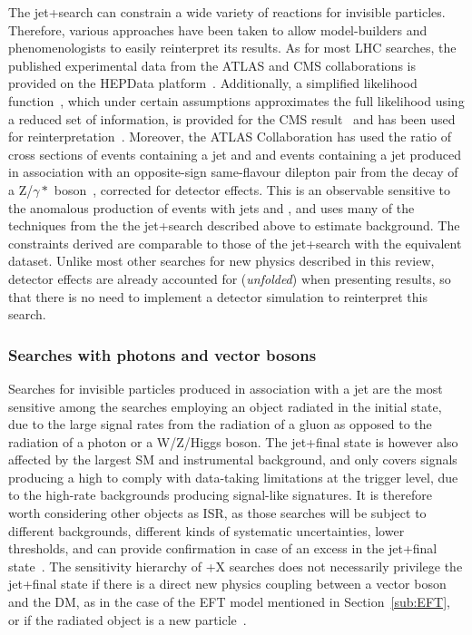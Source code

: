The jet+\MET search can constrain a wide variety of reactions for invisible particles. Therefore, various approaches have been taken to allow model-builders and phenomenologists to easily reinterpret its results. As for most LHC searches, the published experimental data from the ATLAS and CMS collaborations is provided on the HEPData platform~\cite{Maguire:2017ypu}. Additionally, a  simplified likelihood function~\cite{Collaboration:2242860}, which under certain assumptions approximates the full likelihood using a reduced set of information, is provided for the CMS result~\cite{Sirunyan:2017jix} and has been used for reinterpretation~\cite{Pobbe:2017wrj}. Moreover, the ATLAS Collaboration has used the ratio of cross sections of events containing a jet and \MET and events containing a jet produced in association with an opposite-sign same-flavour dilepton pair from the decay of a Z/$\gamma*$ boson~\cite{Aaboud:2017buf}, corrected for detector effects. 
This is an observable sensitive to the anomalous production of events with jets and \MET, and uses many of the techniques from the the jet+\MET search described above to estimate background. The constraints derived are comparable to those of the jet+\MET search with the equivalent dataset. Unlike most other searches for new physics described in this review, detector effects are already accounted for (\textit{unfolded}) when presenting results, so that there is no need to implement a detector simulation to reinterpret this search. 

\subsubsection{Searches with photons and vector bosons}
\label{subsub:monoV}

Searches for invisible particles produced in association with a jet are the most sensitive among the searches employing an object radiated in the initial state, due to the large signal rates from the radiation of a gluon as opposed to the radiation of a photon or a W/Z/Higgs boson. The jet+\MET final state is however also affected by the largest SM and instrumental background, and only covers signals producing a high \MET to comply with data-taking limitations at the trigger level, due to the high-rate backgrounds producing signal-like signatures. It is therefore worth considering other objects as ISR, as those searches will be subject to different backgrounds, different kinds of systematic uncertainties, lower \MET thresholds, and can provide confirmation in case of an excess in the jet+\MET final state~\cite{Birkedal:2004xn,Petriello:2008pu}. 
The sensitivity hierarchy of \MET+X searches does not necessarily privilege the jet+\MET final state if there is a direct new physics coupling between a vector boson and the DM, as in the case of the EFT model mentioned in Section~\ref{sub:EFT}, or if the radiated object is a new particle~\cite{Autran:2015mfa}. 

